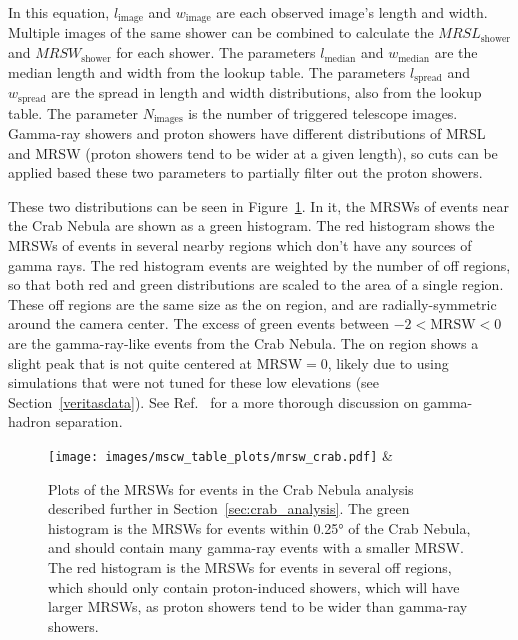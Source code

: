 In this equation, $l_{\textrm{image}}$ and $w_{\textrm{image}}$ are each observed image's length and width.
Multiple images of the same shower can be combined to calculate the $MRSL_{\textrm{shower}}$ and $MRSW_{\textrm{shower}}$ for each shower.
The parameters $l_{\textrm{median}}$ and $w_{\textrm{median}}$ are the median length and width from the lookup table.
The parameters $l_{\textrm{spread}}$ and $w_{\textrm{spread}}$ are the spread in length and width distributions, also from the lookup table.
The parameter $N_{\textrm{images}}$ is the number of triggered telescope images.
Gamma-ray showers and proton showers have different distributions of MRSL and MRSW (proton showers tend to be wider at a given length), so cuts can be applied based these two parameters to partially filter out the proton showers.

These two distributions can be seen in Figure~\ref{fig:mscw_crab}.
In it, the MRSWs of events near the Crab Nebula are shown as a green histogram.
The red histogram shows the MRSWs of events in several nearby regions which don't have any sources of gamma rays.
The red histogram events are weighted by the number of off regions, so that both red and green distributions are scaled to the area of a single region.
These off regions are the same size as the on region, and are radially-symmetric around the camera center.
The excess of green events between $-2<\mathrm{MRSW}<0$ are the gamma-ray-like events from the Crab Nebula.
The on region shows a slight peak that is not quite centered at $\mathrm{MRSW}=0$, likely due to using simulations that were not tuned for these low elevations (see Section~\ref{veritasdata}).
See Ref.~\cite{Krause2017} for a more thorough discussion on gamma-hadron separation.

\begin{figure}[th]
  \centering
  \texttt{[image: images/mscw\_table\_plots/mrsw\_crab.pdf]} &
  \caption[Crab Nebula Mean Reduced Scaled Width]{
    Plots of the MRSWs for events in the Crab Nebula analysis described further in Section~\ref{sec:crab_analysis}.
    The green histogram is the MRSWs for events within \ang{0.25} of the Crab Nebula, and should contain many gamma-ray events with a smaller MRSW.
    The red histogram is the MRSWs for events in several off regions, which should only contain proton-induced showers, which will have larger MRSWs, as proton showers tend to be wider than gamma-ray showers.
  }
  \label{fig:mscw_crab}
\end{figure}


